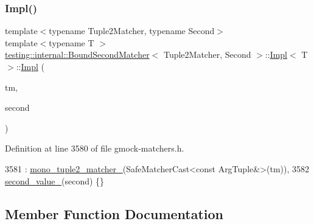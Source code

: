 \subsubsection{\texorpdfstring{Impl()}{Impl()}}
{\footnotesize\ttfamily template$<$typename Tuple2\+Matcher, typename Second$>$ \\
template$<$typename T $>$ \\
\hyperlink{classtesting_1_1internal_1_1BoundSecondMatcher}{testing\+::internal\+::\+Bound\+Second\+Matcher}$<$ Tuple2\+Matcher, Second $>$\+::\hyperlink{classtesting_1_1internal_1_1BoundSecondMatcher_1_1Impl}{Impl}$<$ T $>$\+::\hyperlink{classtesting_1_1internal_1_1BoundSecondMatcher_1_1Impl}{Impl} (\begin{DoxyParamCaption}\item[{const Tuple2\+Matcher \&}]{tm,  }\item[{const Second \&}]{second }\end{DoxyParamCaption})\hspace{0.3cm}{\ttfamily [inline]}}



Definition at line 3580 of file gmock-\/matchers.\+h.


\begin{DoxyCode}
3581         : \hyperlink{classtesting_1_1internal_1_1BoundSecondMatcher_1_1Impl_a7b9610e5665d65f2837eb7e3121c7775}{mono\_tuple2\_matcher\_}(SafeMatcherCast<const ArgTuple&>(tm)),
3582           \hyperlink{classtesting_1_1internal_1_1BoundSecondMatcher_1_1Impl_a240ffac4b65c0fd361d8ff85dca35564}{second\_value\_}(second) \{\}
\end{DoxyCode}


\subsection{Member Function Documentation}
\mbox{\label{classtesting_1_1internal_1_1BoundSecondMatcher_1_1Impl_ada7c4fd01c568c48f929dc34b3281aff}} 
